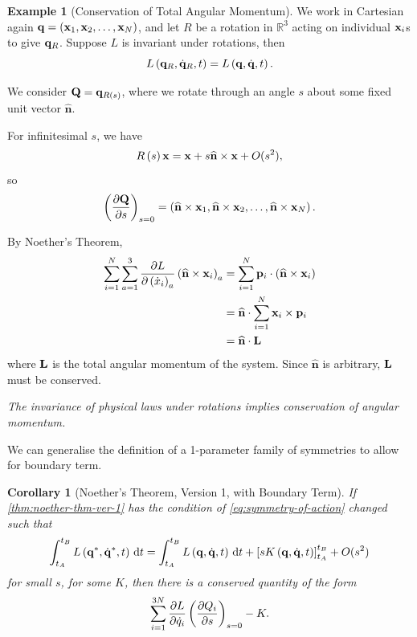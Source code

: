 \documentclass[11pt]{article}
\numberwithin{equation}{section}
\newtheorem{corollary}[theorem]{Corollary}
\theoremstyle{definition}
\newtheorem{example}[theorem]{Example}
\theoremstyle{remark}
\newcommand{\pqty}[1]{\left(#1\right)}
\newcommand{\bqty}[1]{\left[#1\right]}
\newcommand{\RR}{\mathbb{R}}
\newcommand{\vdot}{\cdot}
\newcommand{\cross}{\times}
\newcommand{\unitv}[1]{\widehat{\mathbf{#1}}}
\begin{document}
\begin{example}[Conservation of Total Angular Momentum]\label{variation-unit-0078}
    We work in Cartesian again \(\vb{q} = \pqty{\vb{x}_1, \vb{x}_2, \ldots, \vb{x}_N}\), and let \(R\) be a rotation in \(\RR^3\) acting on individual \(\vb{x}_i\)s to give \(\vb{q}_R\). Suppose \(L\) is invariant under rotations, then
    \[
        L\pqty{\vb{q}_R, \dot{\vb{q}}_R, t} = L \pqty{\vb{q}, \dot{\vb{q}}, t}.
    \]

    We consider \(\vb{Q} = \vb{q}_{R\pqty{s}}\), where we rotate through an angle \(s\) about some fixed unit vector \(\unitv{n}\).

    For infinitesimal \(s\), we have
    \[
        R\pqty{s}\vb{x}=\vb{x}+s\unitv{n}\cross\vb{x}+O(s^2),
    \]
    so
    \[
        \pqty{\pdv{\vb{Q}}{s}}_{s = 0} = \pqty{\unitv{n} \cross \vb{x}_1, \unitv{n} \cross \vb{x}_2, \ldots, \unitv{n} \cross \vb{x}_N}.
    \]
    
    By Noether's Theorem,
    \begin{align*}
        \sum_{i = 1}^{N} \sum_{a = 1}^{3} \pdv{L}{\pqty{\dot{x}_i}_a} \pqty{\unitv{n} \cross \vb{x}_i}_{a} &= \sum_{i = 1}^{N} \vb{p}_i \vdot \pqty{\unitv{n} \cross \vb{x}_i} \\
        &= \unitv{n} \vdot \sum_{i = 1}^{N} \vb{x}_i \cross \vb{p}_i \\
        &= \unitv{n} \vdot \vb{L}
    \end{align*}
    where \(\vb{L}\) is the total angular momentum of the system. Since \(\unitv{n}\) is arbitrary, \(\vb{L}\) must be conserved.

        \textit{The invariance of physical laws under rotations implies conservation of angular momentum.}
\end{example}

We can generalise the definition of a 1-parameter family of symmetries to allow for boundary term.

\begin{corollary}[Noether's Theorem, Version 1, with Boundary Term]\label{variation-unit-0079}
    If \autoref{thm:noether-thm-ver-1} has the condition of \autoref{eq:symmetry-of-action} changed such that
    \begin{equation}
        \label{eq:conserved-symmetry-with-boundary-term}%
        \int_{t_A}^{t_B} L \pqty{\vb{q}^{\ast}, \dot{\vb{q}}^{\ast}, t} \dd{t} = \int_{t_A}^{t_B} L \pqty{\vb{q}, \dot{\vb{q}}, t} \dd{t} + \bqty{s K \pqty{\vb{q}, \dot{\vb{q}}, t}}_{t_A}^{t_B}+O(s^2)
    \end{equation}
    for small \(s\), for some \(K\), then there is a conserved quantity of the form
    \[
        \sum_{i = 1}^{3N} \pdv{L}{\dot{q}_i} \pqty{\pdv{Q_i}{s}}_{s = 0} - K.
    \]
\end{corollary}
\end{document}

